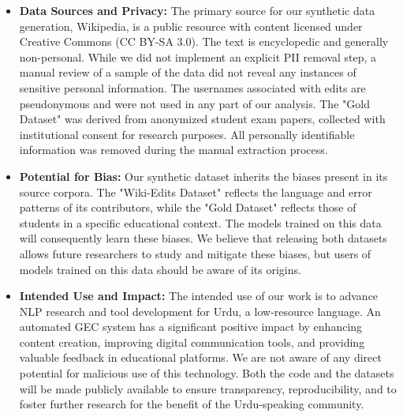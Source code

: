 \documentclass[11pt]{article}
\begin{document}
\begin{itemize}
    \item \textbf{Data Sources and Privacy:} The primary source for our synthetic data generation, Wikipedia, is a public resource with content licensed under Creative Commons (CC BY-SA 3.0). The text is encyclopedic and generally non-personal. While we did not implement an explicit PII removal step, a manual review of a sample of the data did not reveal any instances of sensitive personal information. The usernames associated with edits are pseudonymous and were not used in any part of our analysis. The "Gold Dataset" was derived from anonymized student exam papers, collected with institutional consent for research purposes. All personally identifiable information was removed during the manual extraction process.

    \item \textbf{Potential for Bias:} Our synthetic dataset inherits the biases present in its source corpora. The "Wiki-Edits Dataset" reflects the language and error patterns of its contributors, while the "Gold Dataset" reflects those of students in a specific educational context. The models trained on this data will consequently learn these biases. We believe that releasing both datasets allows future researchers to study and mitigate these biases, but users of models trained on this data should be aware of its origins.

    \item \textbf{Intended Use and Impact:} The intended use of our work is to advance NLP research and tool development for Urdu, a low-resource language. An automated GEC system has a significant positive impact by enhancing content creation, improving digital communication tools, and providing valuable feedback in educational platforms. We are not aware of any direct potential for malicious use of this technology. Both the code and the datasets will be made publicly available to ensure transparency, reproducibility, and to foster further research for the benefit of the Urdu-speaking community.
\end{itemize}





\clearpage
\end{document}
